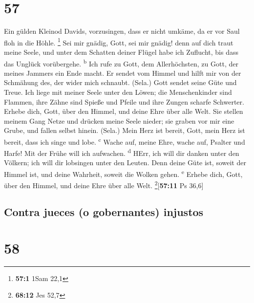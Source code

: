 \hypertarget{section-56}{%
\section{57}\label{section-56}}

 Ein gülden Kleinod Davids, vorzusingen, dass er nicht
umkäme, da er vor Saul floh in die Höhle. \footnote{\textbf{57:1} 1Sam
  22,1}  Sei mir gnädig, Gott, sei mir gnädig! denn auf
dich traut meine Seele, und unter dem Schatten deiner Flügel habe ich
Zuflucht, bis dass das Unglück vorübergehe. \textsuperscript{b}
 Ich rufe zu Gott, dem Allerhöchsten, zu Gott, der meines
Jammers ein Ende macht.  Er sendet vom Himmel und hilft
mir von der Schmähung des, der wider mich schnaubt. (Sela.) Gott sendet
seine Güte und Treue.  Ich liege mit meiner Seele unter
den Löwen; die Menschenkinder sind Flammen, ihre Zähne sind Spieße und
Pfeile und ihre Zungen scharfe Schwerter.  Erhebe dich,
Gott, über den Himmel, und deine Ehre über alle Welt.  Sie
stellen meinem Gang Netze und drücken meine Seele nieder; sie graben vor
mir eine Grube, und fallen selbst hinein. (Sela.)  Mein
Herz ist bereit, Gott, mein Herz ist bereit, dass ich singe und lobe.
\textsuperscript{c}  Wache auf, meine Ehre, wache auf,
Psalter und Harfe! Mit der Frühe will ich aufwachen. \textsuperscript{d}
 HErr, ich will dir danken unter den Völkern; ich will
dir lobsingen unter den Leuten.  Denn deine Güte ist,
soweit der Himmel ist, und deine Wahrheit, soweit die Wolken gehen.
\textsuperscript{e}  Erhebe dich, Gott, über den Himmel,
und deine Ehre über alle Welt. \footnote{\textbf{68:12} Jes 52,7}{[}\textbf{57:11}
Ps 36,6{]}

\hypertarget{contra-jueces-o-gobernantes-injustos}{%
\subsection{Contra jueces (o gobernantes)
injustos}\label{contra-jueces-o-gobernantes-injustos}}

\hypertarget{section-57}{%
\section{58}\label{section-57}}


